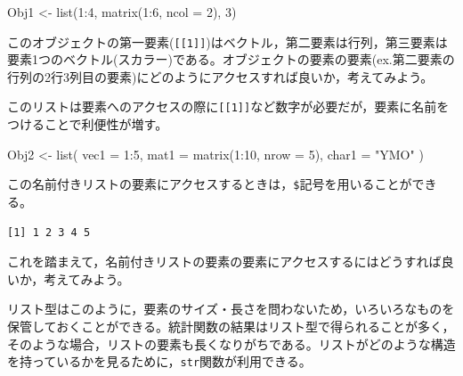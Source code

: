 \documentclass[
  a4paper,
]{ltjsbook}
\newenvironment{Shaded}{\begin{snugshade}}{\end{snugshade}}
\newcommand{\AttributeTok}[1]{\textcolor[rgb]{0.40,0.45,0.13}{#1}}
\newcommand{\DecValTok}[1]{\textcolor[rgb]{0.68,0.00,0.00}{#1}}
\newcommand{\FunctionTok}[1]{\textcolor[rgb]{0.28,0.35,0.67}{#1}}
\newcommand{\NormalTok}[1]{\textcolor[rgb]{0.00,0.23,0.31}{#1}}
\newcommand{\OtherTok}[1]{\textcolor[rgb]{0.00,0.23,0.31}{#1}}
\newcommand{\SpecialCharTok}[1]{\textcolor[rgb]{0.37,0.37,0.37}{#1}}
\newcommand{\StringTok}[1]{\textcolor[rgb]{0.13,0.47,0.30}{#1}}
\begin{document}
\begin{Shaded}
\begin{Highlighting}[]
\NormalTok{Obj1 }\OtherTok{\textless{}{-}} \FunctionTok{list}\NormalTok{(}\DecValTok{1}\SpecialCharTok{:}\DecValTok{4}\NormalTok{, }\FunctionTok{matrix}\NormalTok{(}\DecValTok{1}\SpecialCharTok{:}\DecValTok{6}\NormalTok{, }\AttributeTok{ncol =} \DecValTok{2}\NormalTok{), }\DecValTok{3}\NormalTok{)}
\end{Highlighting}
\end{Shaded}

このオブジェクトの第一要素(\texttt{{[}{[}1{]}{]}})はベクトル，第二要素は行列，第三要素は要素1つのベクトル(スカラー)である。オブジェクトの要素の要素(ex.第二要素の行列の2行3列目の要素)にどのようにアクセスすれば良いか，考えてみよう。

このリストは要素へのアクセスの際に\texttt{{[}{[}1{]}{]}}など数字が必要だが，要素に名前をつけることで利便性が増す。

\begin{Shaded}
\begin{Highlighting}[]
\NormalTok{Obj2 }\OtherTok{\textless{}{-}} \FunctionTok{list}\NormalTok{(}
  \AttributeTok{vec1 =} \DecValTok{1}\SpecialCharTok{:}\DecValTok{5}\NormalTok{,}
  \AttributeTok{mat1 =} \FunctionTok{matrix}\NormalTok{(}\DecValTok{1}\SpecialCharTok{:}\DecValTok{10}\NormalTok{, }\AttributeTok{nrow =} \DecValTok{5}\NormalTok{),}
  \AttributeTok{char1 =} \StringTok{"YMO"}
\NormalTok{)}
\end{Highlighting}
\end{Shaded}

この名前付きリストの要素にアクセスするときは，\texttt{\$}記号を用いることができる。

\begin{Shaded}
\end{Shaded}

\begin{verbatim}
[1] 1 2 3 4 5
\end{verbatim}

これを踏まえて，名前付きリストの要素の要素にアクセスするにはどうすれば良いか，考えてみよう。

リスト型はこのように，要素のサイズ・長さを問わないため，いろいろなものを保管しておくことができる。統計関数の結果はリスト型で得られることが多く，そのような場合，リストの要素も長くなりがちである。リストがどのような構造を持っているかを見るために，\texttt{str}関数が利用できる。
\end{document}
